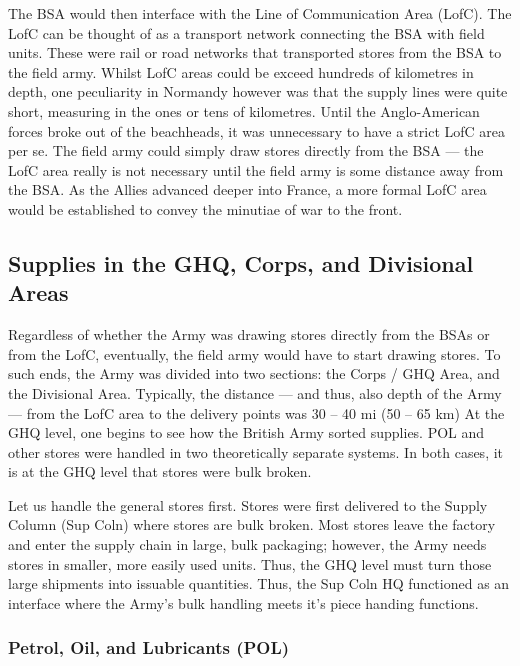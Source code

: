 \documentclass[noraggedright]{turabian-researchpaper}
\newcommand{\SupInWar}{Precis on Lecture ``Supplies in War'', (Part II)}
\begin{document}
The BSA would then interface with the Line of Communication
Area (LofC).  The LofC can be thought of as a transport network connecting 
the BSA with field units.  These were rail or road networks that transported 
stores from the BSA to the field army. %
Whilst LofC areas could be exceed hundreds of kilometres in depth, one 
peculiarity in Normandy however was that the supply lines were quite short, 
measuring in the ones or tens of kilometres.  Until the Anglo-American forces 
broke out of the beachheads, it was unnecessary to have a strict LofC area 
per se.  The field army could simply draw stores directly from the BSA --- 
the LofC area really is not necessary until the field army is some distance 
away from the BSA. %
As the Allies advanced deeper into France, a more formal LofC
area would be established to convey the minutiae of war to the front.

\subsection{Supplies in the GHQ, Corps, and Divisional Areas}

Regardless of whether the Army was drawing stores directly from 
the BSAs or from the LofC, eventually,  the field army would have to start 
drawing stores.  To such ends, the Army was divided into two sections: the 
Corps / GHQ Area, and the Divisional Area.  Typically, the distance --- and 
thus, also depth of the Army --- from the LofC area to the delivery points
was 30 -- 40 mi (50 -- 65 km)  At the GHQ level, one begins to
see how the British Army sorted supplies.  POL and other stores were handled
in two theoretically separate systems.  In both cases, it is at the GHQ level
that stores were bulk broken. %

Let us handle the general stores first.  Stores were first delivered to the 
Supply Column (Sup Coln) where stores are bulk broken.  Most stores leave the
factory and enter the supply chain in large, bulk packaging; however, the
Army needs stores in smaller, more easily used units.  Thus, the GHQ level
must turn those large shipments into issuable quantities.  Thus, the Sup 
Coln HQ functioned as an interface where the Army's bulk handling meets 
it's piece handing functions.\autocite[\SupInWar][3]{27course}

\subsubsection{Petrol, Oil, and Lubricants (POL)}
\end{document}
